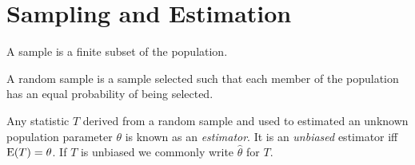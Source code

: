 \documentclass[../Notes.tex]{subfiles}
\begin{document}
\chapter{Sampling and Estimation}
\begin{definition}{}{}
  A sample is a finite subset of the population.
\end{definition}
\begin{definition}{}{}
  A random sample is a sample selected such that each member of the population has an equal probability of being selected.
\end{definition}
\begin{definition}{}{}
  Any statistic \(T\) derived from a random sample and used to estimated an unknown population parameter \(\theta\) is known as an \emph{estimator}. It is an \emph{unbiased} estimator iff \(\operatorname{E}(T)=\theta\). If \(T\) is unbiased we commonly write \(\hat{\theta}\) for \(T\).
\end{definition}
\end{document}
